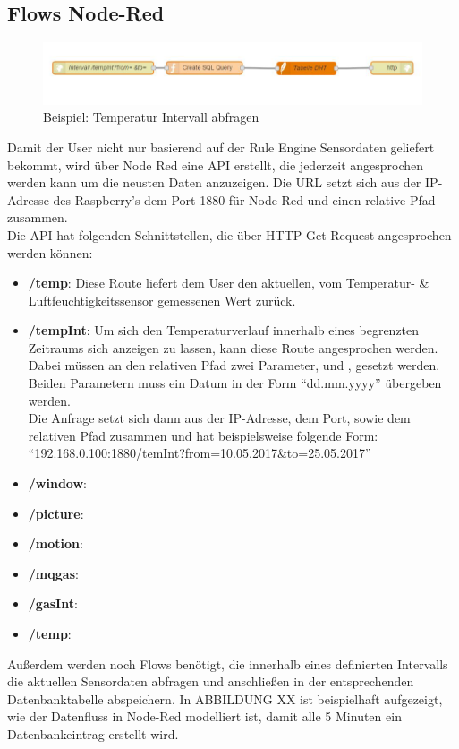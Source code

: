 \subsection{Flows Node-Red}
\begin{figure}
	\centering
	\includegraphics[scale=0.7]{images/tempIntFlow}
	\caption{Beispiel: Temperatur Intervall abfragen}
	\label{flow:TempInt}
\end{figure}
Damit der User nicht nur basierend auf der Rule Engine Sensordaten geliefert bekommt, wird über Node Red eine \acf{API} erstellt, die jederzeit angesprochen werden kann um die neusten Daten anzuzeigen. Die \ac{URL} setzt sich aus der \ac{IP}-Adresse des Raspberry's dem Port 1880 für Node-Red und einen relative Pfad zusammen. 
\\Die \ac{API} hat folgenden Schnittstellen, die über \ac{HTTP}-Get Request angesprochen werden können:
\begin{itemize}
	\item \textbf{/temp}: Diese Route liefert dem User den aktuellen, vom Temperatur- \& Luftfeuchtigkeitssensor gemessenen Wert zurück. 
	\item \textbf{/tempInt}: Um sich den Temperaturverlauf innerhalb eines begrenzten Zeitraums sich anzeigen zu lassen, kann diese Route angesprochen werden. Dabei müssen an den relativen Pfad zwei Parameter,  und ,  gesetzt werden.  Beiden Parametern muss ein Datum in der Form \enquote{dd.mm.yyyy} übergeben werden. \\Die Anfrage setzt sich dann aus der \ac{IP}-Adresse, dem Port, sowie dem relativen Pfad zusammen und hat beispielsweise folgende Form: \enquote{192.168.0.100:1880/temInt?from=10.05.2017\&to=25.05.2017}
	\item \textbf{/window}:
	\item \textbf{/picture}:
	\item \textbf{/motion}:
	\item \textbf{/mqgas}:
	\item \textbf{/gasInt}:
	\item \textbf{/temp}:
\end{itemize}

Außerdem werden noch Flows benötigt, die innerhalb eines definierten Intervalls die aktuellen Sensordaten abfragen und anschließen in der entsprechenden Datenbanktabelle abspeichern. In ABBILDUNG XX ist beispielhaft aufgezeigt, wie der Datenfluss in Node-Red modelliert ist, damit alle 5 Minuten ein Datenbankeintrag erstellt wird. 




